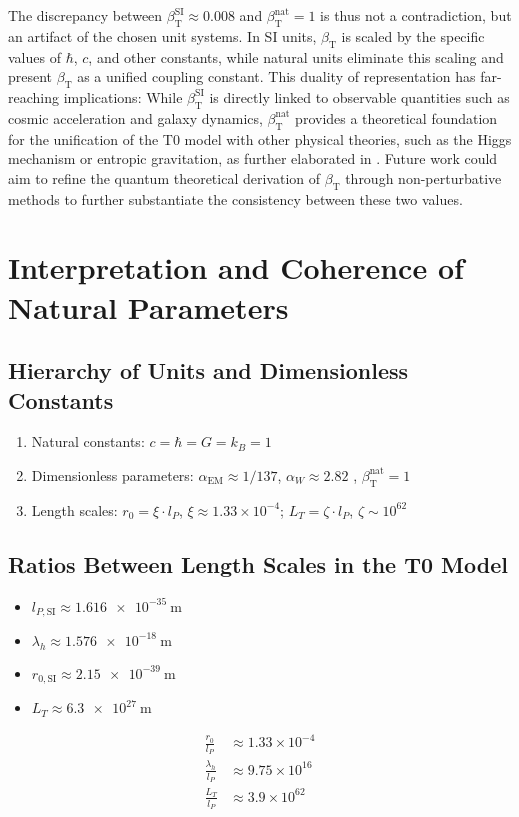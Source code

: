 ﻿\documentclass[12pt,a4paper]{article}
\newcommand{\alphaEM}{\alpha_{\text{EM}}}
\newcommand{\betaT}{\beta_{\text{T}}}
\begin{document}
	The discrepancy between \(\betaT^{\text{SI}} \approx 0.008\) and \(\betaT^{\text{nat}} = 1\) is thus not a contradiction, but an artifact of the chosen unit systems. In SI units, \(\betaT\) is scaled by the specific values of \(\hbar\), \(c\), and other constants, while natural units eliminate this scaling and present \(\betaT\) as a unified coupling constant. This duality of representation has far-reaching implications: While \(\betaT^{\text{SI}}\) is directly linked to observable quantities such as cosmic acceleration and galaxy dynamics, \(\betaT^{\text{nat}}\) provides a theoretical foundation for the unification of the T0 model with other physical theories, such as the Higgs mechanism or entropic gravitation, as further elaborated in \cite{pascher_emergente_gravitation_2025}. Future work could aim to refine the quantum theoretical derivation of \(\betaT\) through non-perturbative methods to further substantiate the consistency between these two values.
	
	\section{Interpretation and Coherence of Natural Parameters}
	
	\subsection{Hierarchy of Units and Dimensionless Constants}
	
	\begin{enumerate}
		\item Natural constants: \(c = \hbar = G = k_B = 1\)
		\item Dimensionless parameters: \(\alphaEM \approx 1/137\), \(\alpha_W \approx 2.82\) \cite{pascher_temp_2025}, \(\betaT^{\text{nat}} = 1\)
		\item Length scales: \(r_0 = \xi \cdot l_P\), \(\xi \approx 1.33 \times 10^{-4}\); \(L_T = \zeta \cdot l_P\), \(\zeta \sim 10^{62}\)
	\end{enumerate}
	
	\subsection{Ratios Between Length Scales in the T0 Model}
	
	\begin{itemize}
		\item \(l_{P,\text{SI}} \approx \SI{1.616e-35}{\meter}\)
		\item \(\lambda_h \approx \SI{1.576e-18}{\meter}\)
		\item \(r_{0,\text{SI}} \approx \SI{2.15e-39}{\meter}\)
		\item \(L_T \approx \SI{6.3e27}{\meter}\)
	\end{itemize}
	\begin{align}
		\frac{r_0}{l_P} &\approx 1.33 \times 10^{-4} \\
		\frac{\lambda_h}{l_P} &\approx 9.75 \times 10^{16} \\
		\frac{L_T}{l_P} &\approx 3.9 \times 10^{62}
	\end{align}
	
\end{document}
